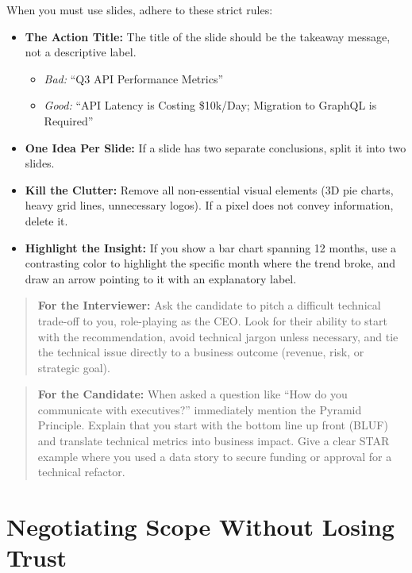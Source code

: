 When you must use slides, adhere to these strict rules:

\begin{itemize}
\tightlist
\item
  \textbf{The Action Title:} The title of the slide should be the
  takeaway message, not a descriptive label.

  \begin{itemize}
  \tightlist
  \item
    \emph{Bad:} ``Q3 API Performance Metrics''
  \item
    \emph{Good:} ``API Latency is Costing \$10k/Day; Migration to
    GraphQL is Required''
  \end{itemize}
\item
  \textbf{One Idea Per Slide:} If a slide has two separate conclusions,
  split it into two slides.
\item
  \textbf{Kill the Clutter:} Remove all non-essential visual elements
  (3D pie charts, heavy grid lines, unnecessary logos). If a pixel does
  not convey information, delete it.
\item
  \textbf{Highlight the Insight:} If you show a bar chart spanning 12
  months, use a contrasting color to highlight the specific month where
  the trend broke, and draw an arrow pointing to it with an explanatory
  label.
\end{itemize}

\begin{quote}
\textbf{For the Interviewer:} Ask the candidate to pitch a difficult
technical trade-off to you, role-playing as the CEO. Look for their
ability to start with the recommendation, avoid technical jargon unless
necessary, and tie the technical issue directly to a business outcome
(revenue, risk, or strategic goal).
\end{quote}

\begin{quote}
\textbf{For the Candidate:} When asked a question like ``How do you
communicate with executives?'' immediately mention the Pyramid
Principle. Explain that you start with the bottom line up front (BLUF)
and translate technical metrics into business impact. Give a clear STAR
example where you used a data story to secure funding or approval for a
technical refactor.
\end{quote}

\bigskip

\section{Negotiating Scope Without Losing
Trust}\label{negotiating-scope-without-losing-trust}


